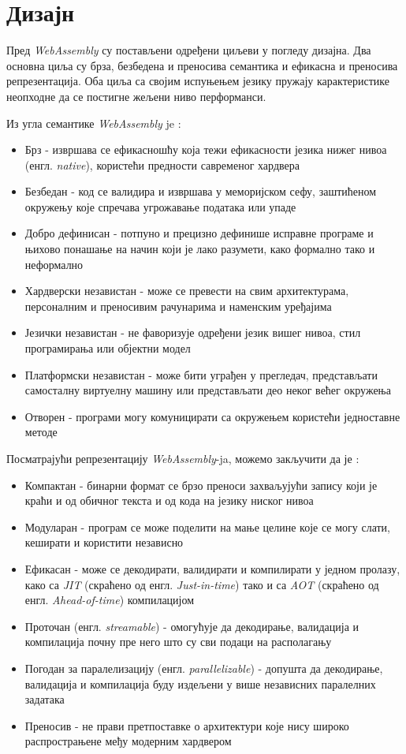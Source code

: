 \documentclass[12pt,oneside]{memoir}
\begin{document}
\section{Дизајн} \label{chp:DESIGN}

Пред \textit{WebAssembly} су постављени одређени циљеви у погледу дизајна. Два основна циља су брза, безбедена и
преносива семантика и ефикасна и преносива репрезентација. Оба циља са својим испуњењем језику пружају
карактеристике неопходне да се постигне жељени ниво перформанси.

Из угла семантике \textit{WebAssembly} je \cite{WASMS}:

\begin{itemize}
	\item Брз - извршава се ефикасношћу која тежи ефикасности језика нижег нивоа (енгл. \textit{native}), користећи
	предности савременог хардвера
	\item Безбедан - код се валидира и извршава у меморијском сефу, заштићеном окружењу које спречава угрожавање
	података или упаде
	\item Добро дефинисан - потпуно и прецизно дефинише исправне програме и њихово понашање на начин који је лако
	разумети, како формално тако и неформално
	\item Хардверски независтан - може се превести на свим архитектурама, персоналним и преносивим рачунарима и
	наменским уређајима
	\item Језички независтан - не фаворизује одређени језик вишег нивоа, стил програмирања или објектни модел
	\item Платформски независтан - може бити уграђен у прегледач, представљати самосталну виртуелну машину или
	представљати део неког већег окружења
	\item Отворен - програми могу комуницирати са окружењем користећи једноставне методе
\end{itemize}
Посматрајући репрезентацију \textit{WebAssembly}-ja, можемо закључити да је \cite{WASMS}:

\begin{itemize}
	\item Компактан - бинарни формат се брзо преноси захваљујући запису који је краћи и од обичног текста и од кода
	на језику ниског нивоа
	\item Модуларан - програм се може поделити на мање целине које се могу слати, кеширати и користити независно
	\item Ефикасан - може се декодирати, валидирати и компилирати у једном пролазу, како са \textit{JIT} (скраћено
	од 
	енгл. \textit{Just-in-time}) тако и са \textit{AOT} (скраћено од енгл. \textit{Ahead-of-time}) компилацијом
	\item Проточан (енгл. \textit{streamable}) - омогућује да декодирање, валидација и компилација почну пре него
	што
	су сви подаци на располагању
	\item Погодан за паралелизацију (енгл. \textit{parallelizable}) - допушта да декодирање, валидација и компилација буду
	издељени у више независних паралелних задатака
	\item Преносив - не прави претпоставке о архитектури које нису широко распрострањене међу модерним хардвером
\end{itemize}
\end{document}
